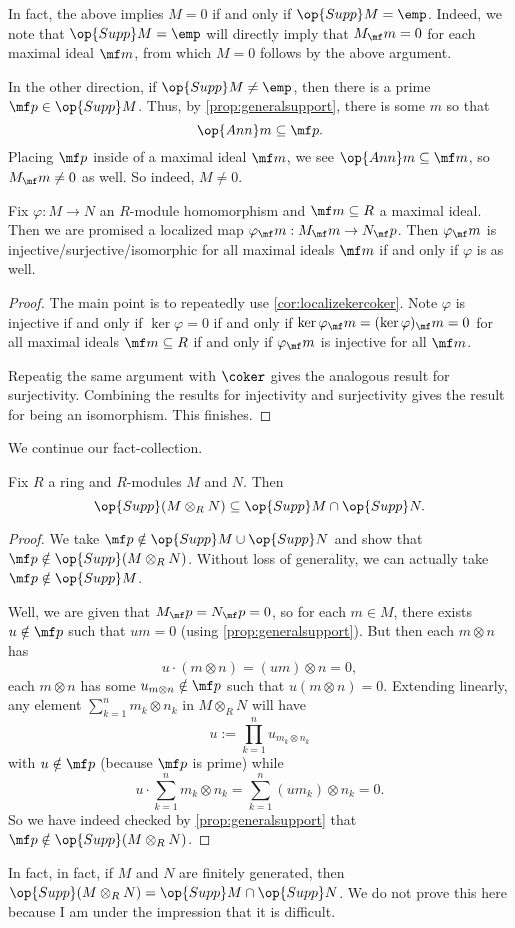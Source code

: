\begin{remark}
	In fact, the above implies $M=0$ if and only if $\op{Supp}M=\emp$. Indeed, we note that $\op{Supp}M=\emp$ will directly imply that $M_\mf m=0$ for each maximal ideal $\mf m$, from which $M=0$ follows by the above argument.
	
	In the other direction, if $\op{Supp}M\ne\emp$, then there is a prime $\mf p\in\op{Supp}M$. Thus, by \autoref{prop:generalsupport}, there is some $m$ so that
	\[\op{Ann}m\subseteq\mf p.\]
	Placing $\mf p$ inside of a maximal ideal $\mf m$, we see $\op{Ann}m\subseteq\mf m$, so $M_\mf m\ne0$ as well. So indeed, $M\ne0$.
\end{remark}
\begin{corollary}
	Fix $\varphi:M\to N$ an $R$-module homomorphism and $\mf m\subseteq R$ a maximal ideal. Then we are promised a localized map $\varphi_\mf m:M_\mf m\to N_\mf p$. Then $\varphi_\mf m$ is injective/surjective/isomorphic for all maximal ideals $\mf m$ if and only if $\varphi$ is as well.
\end{corollary}
\begin{proof}
	The main point is to repeatedly use \autoref{cor:localizekercoker}. Note $\varphi$ is injective if and only if $\ker\varphi=0$ if and only if $\ker\varphi_\mf m=(\ker\varphi)_\mf m=0$ for all maximal ideals $\mf m\subseteq R$ if and only if $\varphi_\mf m$ is injective for all $\mf m$.
	
	Repeatig the same argument with $\coker$ gives the analogous result for surjectivity. Combining the results for injectivity and surjectivity gives the result for being an isomorphism. This finishes.
\end{proof}
We continue our fact-collection.
\begin{proposition}
	Fix $R$ a ring and $R$-modules $M$ and $N$. Then
	\[\op{Supp}(M\otimes_RN)\subseteq\op{Supp}M\cap\op{Supp}N.\]
\end{proposition}
\begin{proof}
	We take $\mf p\notin\op{Supp}M\cup\op{Supp}N$ and show that $\mf p\notin\op{Supp}(M\otimes_RN)$. Without loss of generality, we can actually take $\mf p\notin\op{Supp}M$.

	Well, we are given that $M_\mf p=N_\mf p=0$, so for each $m\in M$, there exists $u\notin\mf p$ such that $um=0$ (using \autoref{prop:generalsupport}). But then each $m\otimes n$ has
	\[u\cdot(m\otimes n)=(um)\otimes n=0,\]
	each $m\otimes n$ has some $u_{m\otimes n}\notin\mf p$ such that $u(m\otimes n)=0$. Extending linearly, any element $\sum_{k=1}^nm_k\otimes n_k$ in $M\otimes_RN$ will have
	\[u:=\prod_{k=1}^nu_{m_k\otimes n_k}\]
	with $u\notin\mf p$ (because $\mf p$ is prime) while
	\[u\cdot\sum_{k=1}^nm_k\otimes n_k=\sum_{k=1}^n(um_k)\otimes n_k=0.\]
	So we have indeed checked by \autoref{prop:generalsupport} that $\mf p\notin\op{Supp}(M\otimes_RN)$.
\end{proof}
\begin{remark}
	In fact, in fact, if $M$ and $N$ are finitely generated, then $\op{Supp}(M\otimes_RN)=\op{Supp}M\cap\op{Supp}N$. We do not prove this here because I am under the impression that it is difficult.
\end{remark}

